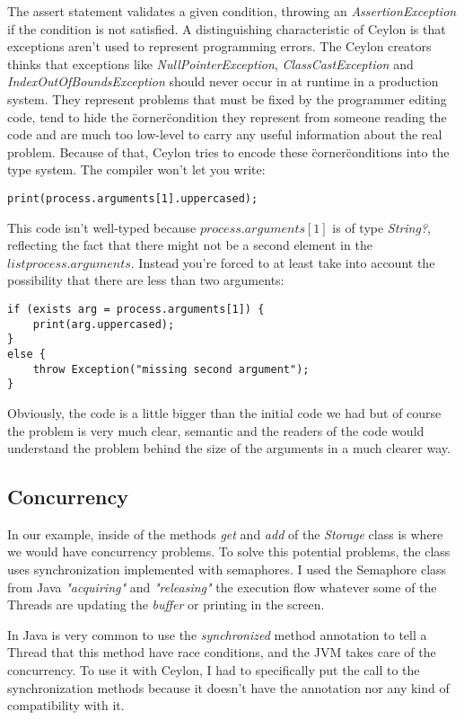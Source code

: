 \documentclass{abnt}
\begin{document}
The assert statement validates a given condition, throwing an
\textit{AssertionException} if the condition is not satisfied. A distinguishing
characteristic of Ceylon is that exceptions aren't used to represent programming
errors. The Ceylon creators thinks that exceptions like \textit{NullPointerException},
\textit{ClassCastException} and \textit{IndexOutOfBoundsException} should never occur in at
runtime in a production system. They represent problems that must be fixed by
the programmer editing code, tend to hide the \"corner\" condition they represent
from someone reading the code and are much too low-level to carry any useful
information about the real problem. Because of that, Ceylon tries to encode
these \"corner\" conditions into the type system.
The compiler won't let you write:

\begin{lstlisting}[label=cpc,caption=Ceylon Producer-Consumer example]
print(process.arguments[1].uppercased);
\end{lstlisting}

This code isn't well-typed because $process.arguments[1]$ is of type
\textit{String?}, reflecting the fact that there might not be a second element in the
$list process.arguments$. Instead you're forced to at least take into
account the possibility that there are less than two arguments:

\begin{lstlisting}[label=cpc,caption=Ceylon Producer-Consumer example]
if (exists arg = process.arguments[1]) {
    print(arg.uppercased);
}
else {
    throw Exception("missing second argument");
}
\end{lstlisting}

Obviously, the code is a little bigger than the initial code we had but of
course the problem is very much clear, semantic and the readers of the code
would understand the problem behind the size of the arguments in a much clearer
way.

\subsection{Concurrency}

In our example, inside of the methods \textit{get} and \textit{add} of the \textit{Storage} class is
where we would have concurrency problems\cite{2_1}. To solve this potential
problems, the class uses synchronization implemented with semaphores. I used the
Semaphore class from Java \textit{"acquiring"} and \textit{"releasing"} the
execution flow whatever some of the Threads are updating the \textit{buffer} or
printing in the screen.

In Java is very common to use the \textit{synchronized} method annotation to tell a
Thread that this method have race conditions, and the JVM takes care of the
concurrency. To use it with Ceylon, I had to specifically put the call to the
synchronization methods because it doesn't have the annotation nor any kind of
compatibility with it.


\end{document}
